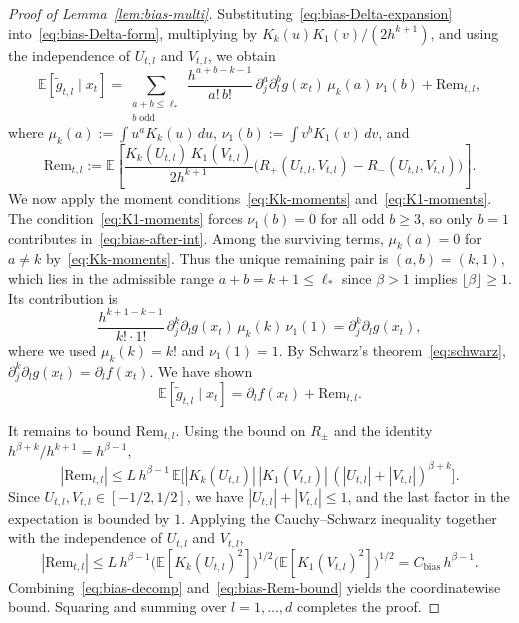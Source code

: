 \documentclass{article}
\renewcommand{\leq}{\leqslant}
\renewcommand{\geq}{\geqslant}
\theoremstyle{definition}
\begin{document}
\begin{proof}[Proof of Lemma~\ref{lem:bias-multi}]
Substituting~\eqref{eq:bias-Delta-expansion} 
into~\eqref{eq:bias-Delta-form}, multiplying by 
$K_k(u)K_1(v)/(2h^{k+1})$, and using the independence of $U_{t,l}$ 
and $V_{t,l}$, we obtain
\begin{equation}
\label{eq:bias-after-int}
\mathbb{E}[\tilde{g}_{t,l}\mid x_t]
=\!\!\!\sum_{\substack{a+b\leq \ell_*\\b\;\mathrm{odd}}}\!\!
\frac{h^{a+b-k-1}}{a!\,b!}\,
\partial_j^a\partial_l^b g(x_t)\,\mu_k(a)\,\nu_1(b)
+\mathrm{Rem}_{t,l},
\end{equation}
where $\mu_k(a):=\int u^a K_k(u)\,du$, $\nu_1(b):=\int v^b 
K_1(v)\,dv$, and 
$$
\mathrm{Rem}_{t,l}
:=\mathbb{E}\!\left[\frac{K_k(U_{t,l})\,K_1(V_{t,l})}{2h^{k+1}}
\bigl(R_+(U_{t,l},V_{t,l})-R_-(U_{t,l},V_{t,l})\bigr)\right].
$$
We now apply the moment 
conditions~\eqref{eq:Kk-moments} and~\eqref{eq:K1-moments}. The 
condition~\eqref{eq:K1-moments} forces $\nu_1(b)=0$ for all odd 
$b\geq 3$, so only $b=1$ contributes 
in~\eqref{eq:bias-after-int}. Among the surviving terms, 
$\mu_k(a)=0$ for $a\neq k$ by~\eqref{eq:Kk-moments}. Thus the 
unique remaining pair is $(a,b)=(k,1)$, which lies in the 
admissible range $a+b=k+1\leq \ell_*$ since $\beta>1$ implies 
$\lfloor\beta\rfloor\geq 1$. Its contribution is
$$
\frac{h^{k+1-k-1}}{k!\cdot 1!}\,
\partial_j^k\partial_l g(x_t)\,
\mu_k(k)\,\nu_1(1)
=\partial_j^k\partial_l g(x_t),
$$
where we used $\mu_k(k)=k!$ and $\nu_1(1)=1$. By Schwarz's 
theorem~\eqref{eq:schwarz}, 
$\partial_j^k\partial_l g(x_t)=\partial_l f(x_t)$. We have shown
\begin{equation}
\label{eq:bias-decomp}
\mathbb{E}[\tilde{g}_{t,l}\mid x_t]=\partial_l f(x_t)
+\mathrm{Rem}_{t,l}.
\end{equation}

It remains to bound $\mathrm{Rem}_{t,l}$. Using the bound on 
$R_\pm$ and the identity $h^{\beta+k}/h^{k+1}=h^{\beta-1}$,
$$
|\mathrm{Rem}_{t,l}|
\leq L\,h^{\beta-1}\,
\mathbb{E}\bigl[|K_k(U_{t,l})|\,|K_1(V_{t,l})|\,
(|U_{t,l}|+|V_{t,l}|)^{\beta+k}\bigr].
$$
Since $U_{t,l},V_{t,l}\in[-1/2,1/2]$, we have 
$|U_{t,l}|+|V_{t,l}|\leq 1$, and the last factor in the expectation 
is bounded by $1$. Applying the Cauchy--Schwarz inequality together 
with the independence of $U_{t,l}$ and $V_{t,l}$,
\begin{equation}
\label{eq:bias-Rem-bound}
|\mathrm{Rem}_{t,l}|
\leq L\,h^{\beta-1}
\bigl(\mathbb{E}[K_k(U_{t,l})^2]\bigr)^{1/2}
\bigl(\mathbb{E}[K_1(V_{t,l})^2]\bigr)^{1/2}
=C_{\mathrm{bias}}\,h^{\beta-1}.
\end{equation}
Combining~\eqref{eq:bias-decomp} and~\eqref{eq:bias-Rem-bound} 
yields the coordinatewise bound. Squaring and summing over 
$l=1,\dots,d$ completes the proof.
\end{proof}
\end{document}
